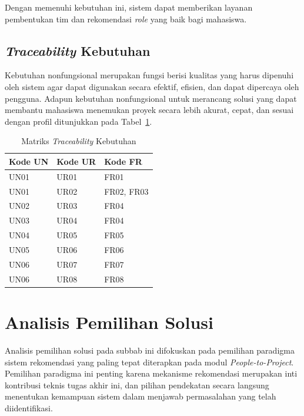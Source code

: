 Dengan memenuhi kebutuhan ini, sistem dapat memberikan layanan pembentukan tim dan rekomendasi \emph{role} yang baik bagi mahasiswa.

\subsection{\emph{Traceability} Kebutuhan}

Kebutuhan nonfungsional merupakan fungsi berisi kualitas yang harus dipenuhi oleh sistem agar dapat digunakan secara efektif, efisien, dan dapat dipercaya oleh pengguna. Adapun kebutuhan nonfungsional untuk merancang solusi yang dapat membantu mahasiswa menemukan proyek secara lebih akurat, cepat, dan sesuai dengan profil ditunjukkan pada Tabel~\ref{tab:traceability}.

\begin{table}[H]
  \caption{Matriks \emph{Traceability} Kebutuhan}
  \label{tab:traceability}
  \begin{tabularx}{\textwidth}{p{2cm} p{2cm} X}
    \toprule
    \textbf{Kode UN} & \textbf{Kode UR} & \textbf{Kode FR} \\
    \midrule
    UN01 & UR01 & FR01 \\
    \midrule
    UN01 & UR02 & FR02, FR03 \\
    \midrule
    UN02 & UR03 & FR04 \\
    \midrule
    UN03 & UR04 & FR04 \\
    \midrule
    UN04 & UR05 & FR05 \\
    \midrule
    UN05 & UR06 & FR06 \\
    \midrule
    UN06 & UR07 & FR07 \\
    \midrule
    UN06 & UR08 & FR08 \\
    \bottomrule
  \end{tabularx}
\end{table}

\section{Analisis Pemilihan Solusi}

Analisis pemilihan solusi pada subbab ini difokuskan pada pemilihan paradigma sistem rekomendasi yang paling tepat diterapkan pada modul \emph{People-to-Project}. Pemilihan paradigma ini penting karena mekanisme rekomendasi merupakan inti kontribusi teknis tugas akhir ini, dan pilihan pendekatan secara langsung menentukan kemampuan sistem dalam menjawab permasalahan yang telah diidentifikasi.


